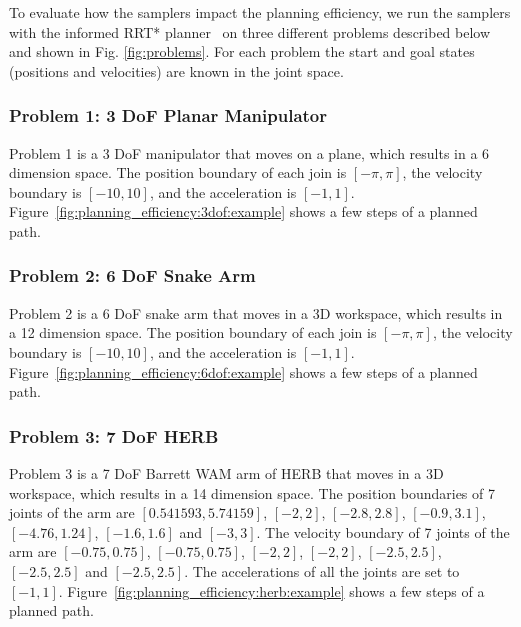 \documentclass[letterpaper, 10 pt, conference]{ieeeconf}  %
\begin{document}
To evaluate how the samplers impact the planning efficiency, we run the samplers with the informed RRT* planner~\cite{GSB14} on three different problems described below and shown in Fig. \ref{fig:problems}. 
For each problem the start and goal states (positions and velocities) are known in the joint space.
\subsubsection{Problem 1: 3 DoF Planar Manipulator}

Problem 1 is a 3 DoF manipulator that moves on a plane, which results in a 6 dimension space.
The position boundary of each join is $ [ - \pi , \pi ] $, the velocity boundary is $ [-10, 10] $, and the acceleration is $ [-1,1] $.
Figure~\ref{fig:planning_efficiency:3dof:example} shows a few steps of a planned path.

\subsubsection{Problem 2: 6 DoF Snake Arm}

Problem 2 is a 6 DoF snake arm that moves in a 3D workspace, which results in a 12 dimension space.
The position boundary of each join is $ [ - \pi , \pi ] $, the velocity boundary is $ [-10, 10] $, and the acceleration is $ [-1,1] $.
Figure~\ref{fig:planning_efficiency:6dof:example} shows a few steps of a planned path.

\subsubsection{Problem 3: 7 DoF HERB}

Problem 3 is a 7 DoF Barrett WAM arm of HERB that moves in a 3D workspace, which results in a 14 dimension space.
The position boundaries of 7 joints of the arm are $  [0.541593 , 5.74159] $, $  [-2 , 2] $, $ [-2.8 , 2.8] $, $ [-0.9 , 3.1] $, $ [-4.76 , 1.24] $, $ [-1.6 , 1.6] $ and $ [-3 , 3] $.
The velocity boundary of 7 joints of the arm are $ [-0.75 , 0.75] $, $ [-0.75 , 0.75] $, $ [-2 , 2] $, $ [-2 , 2] $, $ [-2.5 , 2.5] $, $ [-2.5 , 2.5] $ and $ [-2.5 , 2.5] $.
The accelerations of all the joints are set to $ [-1,1] $.
Figure~\ref{fig:planning_efficiency:herb:example} shows a few steps of a planned path.
\end{document}
